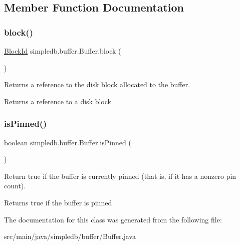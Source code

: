 \subsection{Member Function Documentation}
\mbox{\label{classsimpledb_1_1buffer_1_1Buffer_a788d7d5ccd48a559ed05347b3fc05e4f}} 
\subsubsection{\texorpdfstring{block()}{block()}}
{\footnotesize\ttfamily \hyperlink{classsimpledb_1_1file_1_1BlockId}{Block\+Id} simpledb.\+buffer.\+Buffer.\+block (\begin{DoxyParamCaption}{ }\end{DoxyParamCaption})\hspace{0.3cm}{\ttfamily [inline]}}

Returns a reference to the disk block allocated to the buffer. \begin{DoxyReturn}{Returns}
a reference to a disk block 
\end{DoxyReturn}
\mbox{\label{classsimpledb_1_1buffer_1_1Buffer_a01c37a49ef6b653f7aa160f1900edb45}} 
\subsubsection{\texorpdfstring{is\+Pinned()}{isPinned()}}
{\footnotesize\ttfamily boolean simpledb.\+buffer.\+Buffer.\+is\+Pinned (\begin{DoxyParamCaption}{ }\end{DoxyParamCaption})\hspace{0.3cm}{\ttfamily [inline]}}

Return true if the buffer is currently pinned (that is, if it has a nonzero pin count). \begin{DoxyReturn}{Returns}
true if the buffer is pinned 
\end{DoxyReturn}


The documentation for this class was generated from the following file\+:\begin{DoxyCompactItemize}
\item 
src/main/java/simpledb/buffer/Buffer.\+java\end{DoxyCompactItemize}
